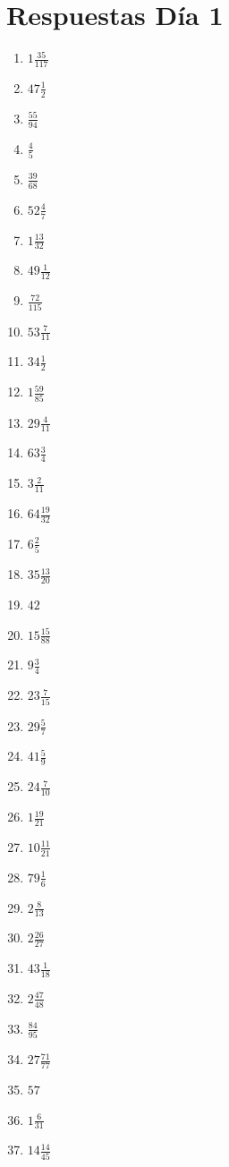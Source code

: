 \documentclass[12pt]{article}
\begin{document}
\section*{Respuestas Día 1}
\begin{enumerate}
\item $ 1 \frac{35}{117} $
\item $ 47 \frac{1}{2} $
\item $ \frac{55}{94} $
\item $ \frac{4}{5} $
\item $ \frac{39}{68} $
\item $ 52 \frac{4}{7} $
\item $ 1 \frac{13}{32} $
\item $ 49 \frac{1}{12} $
\item $ \frac{72}{115} $
\item $ 53 \frac{7}{11} $
\item $ 34 \frac{1}{2} $
\item $ 1 \frac{59}{85} $
\item $ 29 \frac{4}{11} $
\item $ 63 \frac{3}{4} $
\item $ 3 \frac{2}{11} $
\item $ 64 \frac{19}{32} $
\item $ 6 \frac{2}{5} $
\item $ 35 \frac{13}{20} $
\item $ 42 $
\item $ 15 \frac{15}{88} $
\item $ 9 \frac{3}{4} $
\item $ 23 \frac{7}{15} $
\item $ 29 \frac{5}{7} $
\item $ 41 \frac{5}{9} $
\item $ 24 \frac{7}{10} $
\item $ 1 \frac{19}{21} $
\item $ 10 \frac{11}{21} $
\item $ 79 \frac{1}{6} $
\item $ 2 \frac{8}{13} $
\item $ 2 \frac{26}{27} $
\item $ 43 \frac{1}{18} $
\item $ 2 \frac{47}{48} $
\item $ \frac{84}{95} $
\item $ 27 \frac{71}{77} $
\item $ 57 $
\item $ 1 \frac{6}{31} $
\item $ 14 \frac{14}{45} $

\end{enumerate}
\end{document}

